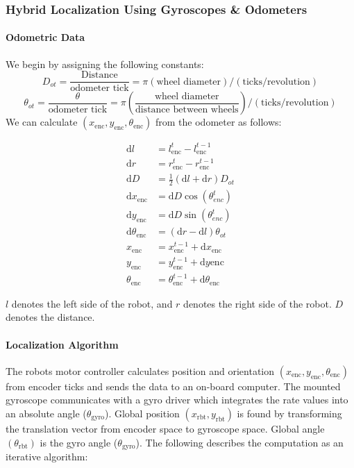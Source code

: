 \subsubsection{Hybrid Localization Using Gyroscopes \& Odometers}
\paragraph{Odometric Data}
We begin by assigning the following constants: 
\[D_{ot}=\frac{\text{Distance}}{\text{odometer tick}}=\pi(\text{wheel diameter})/(\text{ticks/revolution})\]\[ \theta_{ot} = \frac{\theta}{\text{odometer tick}} = \pi\left(\frac{\text{wheel diameter}}{\text{distance between wheels}}\right)/(\text{ticks/revolution})\]
We can calculate $(x_{\mathrm{enc}}, y_{\mathrm{enc}}, \theta_{\mathrm{enc}})$ from the odometer as follows: 
\begin{center}
	\begin{align*}
		\mathrm{d}l &= l^t_{\mathrm{enc}}-l^{t-1}_{\mathrm{enc}} \\
		\mathrm{d}r &= r^t_{\mathrm{enc}}-r^{t-1}_{\mathrm{enc}} \\
		\mathrm{d}D &= \frac{1}{2}(\mathrm{d}l+\mathrm{d}r)D_{ot} \\
		\mathrm{d}x_{\mathrm{enc}} &= \mathrm{d}D\cos(\theta^t_{enc}) \\
		\mathrm{d}y_{\mathrm{enc}} &= \mathrm{d}D\sin(\theta^t_{enc}) \\
		\mathrm{d}\theta_{\mathrm{enc}} &= (\mathrm{d}r-\mathrm{d}l)\theta_{ot} \\
		x_{\mathrm{enc}} &= x^{t-1}_{\mathrm{enc}} + \mathrm{d}x_{\mathrm{enc}} \\
		y_{\mathrm{enc}} &= y^{t-1}_{\mathrm{enc}} + \mathrm{d}y{\mathrm{enc}} \\
		\theta_{\mathrm{enc}} &= \theta^{t-1}_{\mathrm{enc}} + \mathrm{d}\theta_{\mathrm{enc}}
	\end{align*}
\end{center}

$l$ denotes the left side of the robot, and $r$ denotes the right side of the robot. $D$ denotes the distance. 

\paragraph{Localization Algorithm}
The robots motor controller calculates position and orientation $(x_{\mathrm{enc}}, y_{\mathrm{enc}}, \theta_{\mathrm{enc}})$ from encoder ticks and sends the data to an on-board computer. The mounted gyroscope communicates with a gyro driver which integrates the rate values into an absolute angle ($\theta_{\mathrm{gyro}}$). Global position $(x_{\mathrm{rbt}}, y_{\mathrm{rbt}})$ is found by transforming the translation vector from encoder space to gyroscope space. Global angle $(\theta_{\mathrm{rbt}})$ is the gyro angle ($\theta_{\mathrm{gyro}}$). The following describes the computation as an iterative algorithm: 

